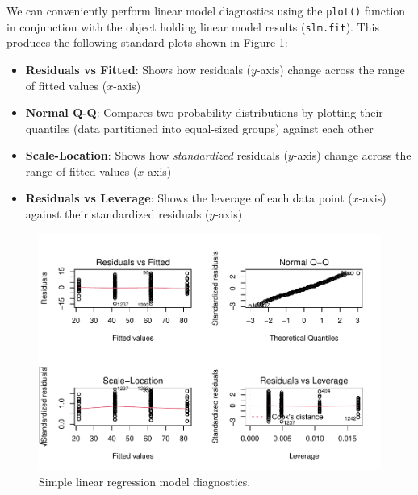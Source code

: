 \documentclass[
]{book}
\providecommand{\tightlist}{%
  \setlength{\itemsep}{0pt}\setlength{\parskip}{0pt}}
\begin{document}
We can conveniently perform linear model diagnostics using the \texttt{plot()} function in conjunction with the object holding linear model results (\texttt{slm.fit}). This produces the following standard plots shown in Figure \ref{fig:slm-diagnostics}:

\begin{itemize}
\tightlist
\item
  \textbf{Residuals vs Fitted}: Shows how residuals (\(y\)-axis) change across the range of fitted values (\(x\)-axis)
\item
  \textbf{Normal Q-Q}: Compares two probability distributions by plotting their quantiles (data partitioned into equal-sized groups) against each other
\item
  \textbf{Scale-Location}: Shows how \emph{standardized} residuals (\(y\)-axis) change across the range of fitted values (\(x\)-axis)
\item
  \textbf{Residuals vs Leverage}: Shows the leverage of each data point (\(x\)-axis) against their standardized residuals (\(y\)-axis)
\end{itemize}

\begin{figure}

{\centering \includegraphics[width=1\linewidth]{People_Analytics_Lifecycle_files/figure-latex/slm-diagnostics-1} 

}

\caption{Simple linear regression model diagnostics.}\label{fig:slm-diagnostics}
\end{figure}
\end{document}
